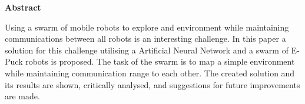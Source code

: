 \thispagestyle{empty}

\begin{center}
    {\LARGE\bf Abstract}
\end{center}

Using a swarm of mobile robots to explore and environment while maintaining communications between all robots is an interesting challenge.
In this paper a solution for this challenge utilising a Artificial Neural Network and a swarm of E-Puck robots is proposed.
The task of the swarm is to map a simple environment while maintaining communication range to each other. The created solution and its results are shown, critically analysed, and suggestions for future improvements are made.  


